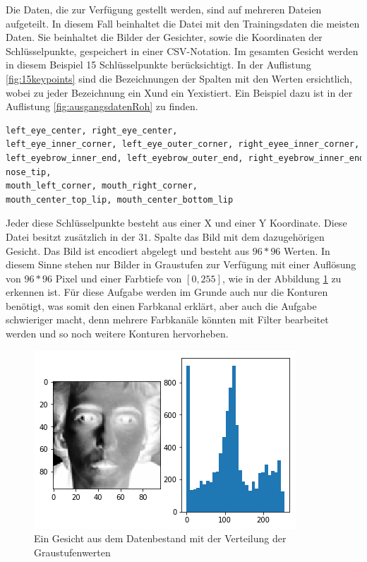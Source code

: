 Die Daten, die zur Verfügung gestellt werden, sind auf mehreren Dateien aufgeteilt. 
In diesem Fall beinhaltet die Datei mit den Trainingsdaten die meisten Daten. 
Sie beinhaltet die Bilder der Gesichter, sowie die Koordinaten der Schlüsselpunkte, gespeichert in einer CSV-Notation.
Im gesamten Gesicht werden in diesem Beispiel 15 Schlüsselpunkte berücksichtigt. 
In der Auflistung \ref{fig:15keypoints} sind die Bezeichnungen der Spalten mit den Werten ersichtlich, wobei zu jeder Bezeichnung ein \glqq X\grqq und ein \glqq Y\grqq existiert.
Ein Beispiel dazu ist in der Auflistung \ref{fig:ausgangsdatenRoh} zu finden.
\begin{lstlisting}[caption={$15$ Schlüsselpunkte im Gesicht eines Menschen},label=fig:15keypoints,captionpos=b,language=Python]
left_eye_center, right_eye_center, 
left_eye_inner_corner, left_eye_outer_corner, right_eyee_inner_corner, right_eye_outer_corner, 
left_eyebrow_inner_end, left_eyebrow_outer_end, right_eyebrow_inner_end, right_eyebrow_outer_end, 
nose_tip, 
mouth_left_corner, mouth_right_corner, 
mouth_center_top_lip, mouth_center_bottom_lip
\end{lstlisting}
Jeder diese Schlüsselpunkte besteht aus einer X und einer Y Koordinate. 
Diese Datei besitzt zusätzlich in der $31.$ Spalte das Bild mit dem dazugehörigen Gesicht.
Das Bild ist encodiert abgelegt und besteht aus $96 * 96$ Werten. 
In diesem Sinne stehen nur Bilder in Graustufen zur Verfügung mit einer Auflösung von $96 * 96$ Pixel und einer Farbtiefe von $[0, 255]$, wie in der Abbildung \ref{fig:ausgangsdaten} zu erkennen ist. 
Für diese Aufgabe werden im Grunde auch nur die Konturen benötigt, was somit den einen Farbkanal erklärt, aber auch die Aufgabe schwieriger macht, denn mehrere Farbkanäle könnten mit Filter bearbeitet werden und so noch weitere Konturen hervorheben. 
\begin{figure}
	\centering
	\includegraphics[scale=0.75]{images/ausgangsDaten.png}
	\caption{Ein Gesicht aus dem Datenbestand mit der Verteilung der Graustufenwerten}
	\label{fig:ausgangsdaten}
\end{figure}
